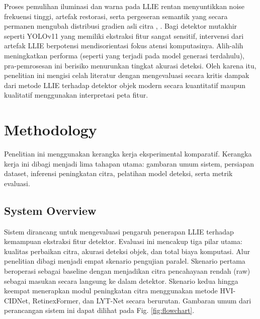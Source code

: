 \documentclass[conference]{IEEEtran}
\begin{document}
Proses pemulihan iluminasi dan warna pada LLIE rentan menyuntikkan noise frekuensi tinggi, artefak restorasi, serta pergeseran semantik yang secara permanen mengubah distribusi gradien asli citra \cite{wu2024llieeffect}, \cite{gong2025multiscale}. Bagi detektor mutakhir seperti YOLOv11 yang memiliki ekstraksi fitur sangat sensitif, intervensi dari artefak LLIE berpotensi mendisorientasi fokus atensi komputasinya. Alih-alih meningkatkan performa (seperti yang terjadi pada model generasi terdahulu), pra-pemrosesan ini berisiko menurunkan tingkat akurasi deteksi. Oleh karena itu, penelitian ini mengisi celah literatur dengan mengevaluasi secara kritis dampak dari metode LLIE terhadap detektor objek modern secara kuantitatif maupun kualitatif menggunakan interpretasi peta fitur.


\section{Methodology}

Penelitian ini menggunakan kerangka kerja eksperimental komparatif. Kerangka kerja ini dibagi menjadi lima tahapan utama: gambaran umum sistem, persiapan dataset, inferensi peningkatan citra, pelatihan model deteksi, serta metrik evaluasi.

\subsection{System Overview}
Sistem dirancang untuk mengevaluasi pengaruh penerapan LLIE terhadap kemampuan ekstraksi fitur detektor. Evaluasi ini mencakup tiga pilar utama: kualitas perbaikan citra, akurasi deteksi objek, dan total biaya komputasi. Alur penelitian dibagi menjadi empat skenario pengujian paralel. Skenario pertama beroperasi sebagai baseline dengan menjadikan citra pencahayaan rendah (raw) sebagai masukan secara langsung ke dalam detektor. Skenario kedua hingga keempat menerapkan modul peningkatan citra menggunakan metode HVI-CIDNet, RetinexFormer, dan LYT-Net secara berurutan. Gambaran umum dari perancangan sistem ini dapat dilihat pada Fig. \ref{fig:flowchart}.
\end{document}
